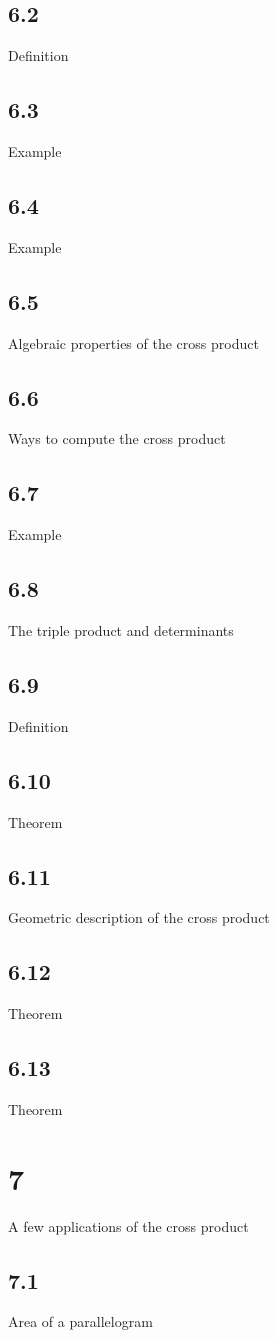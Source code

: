 \subsection{6.2}{Definition}
\subsection{6.3}{Example}
\subsection{6.4}{Example}
\subsection{6.5}{Algebraic properties of the cross product}
\subsection{6.6}{Ways to compute the cross product}
\subsection{6.7}{Example}
\subsection{6.8}{The triple product and determinants}
\subsection{6.9}{Definition}
\subsection{6.10}{Theorem}
\subsection{6.11}{Geometric description of the cross product}
\subsection{6.12}{Theorem}
\subsection{6.13}{Theorem}
\section{7}{A few applications of the cross product}
\subsection{7.1}{Area of a parallelogram}
